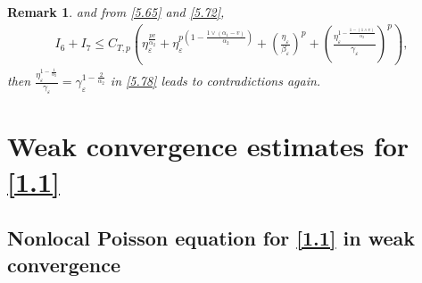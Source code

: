 \documentclass[11pt,reqno]{amsart}
\newtheorem{remark}{\indent Remark}[section]
\numberwithin{equation}{section}
\begin{document}
\begin{remark}
and from \eqref{5.65} and \eqref{5.72},
\begin{equation}\label{5.79}
	\begin{split}
		I_{6}+I_{7}\leq  C_{T,p}\left(\eta_{\varepsilon}^{\frac{pv}{\alpha_{2}}}+\eta_{\varepsilon}^{p(1-\frac{1\vee(\alpha_{1}-v)}{\alpha_{2}})}+\left( \frac{\eta_{\varepsilon}}{\beta_{\varepsilon}}\right)^{p} + \left( \frac{\eta_{\varepsilon}^{1-\frac{1-(1\wedge v)}{\alpha_{2}}}}{\gamma_{\varepsilon}}\right)^{p}\right),
	\end{split}
\end{equation}
then $\frac{\eta_{\varepsilon}^{1-\frac{1}{\alpha_{2}}}}{\gamma_{\varepsilon}}=\gamma_{\varepsilon}^{1-\frac{2}{\alpha_{2}}}$ in \eqref{5.78} leads to contradictions again.

\end{remark}





\section{Weak convergence estimates for \ref{1.1} }

\subsection{Nonlocal Poisson equation for \eqref{1.1} in weak convergence}
\end{document}
